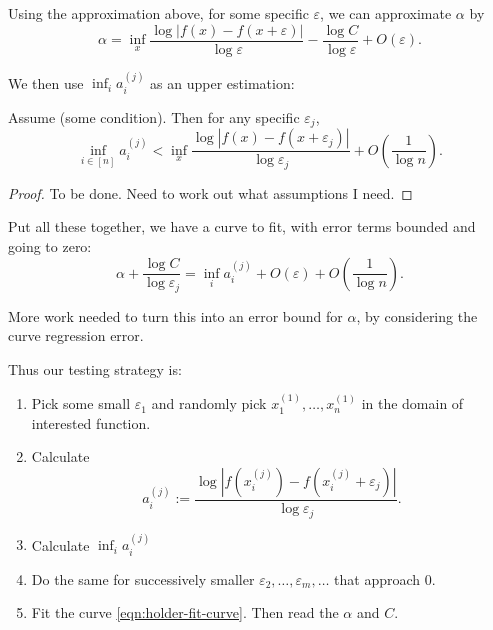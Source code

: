 Using the approximation above, for some specific $\varepsilon$, we can approximate $\alpha$ by
\[
	\alpha = \operatorname{inf}_x
		\frac{\log \left| f(x) - f(x+\varepsilon) \right|}{\log \varepsilon}
-\frac{\log C}{\log \varepsilon}  + O(\varepsilon)
.\] 

We then use $\operatorname{inf} _i a_i^{(j)}$ as an upper estimation:

\begin{theorem}
	Assume (some condition). Then for any specific $\varepsilon_j$,
\[
	\operatorname{inf} _{i \in [n]} a_i^{(j)} <
	 \operatorname{inf}_x
		\frac{\log \left| f(x) - f(x+\varepsilon_j) \right|}{\log \varepsilon_j} + O\left(\frac{1}{\log n}\right)
.\] 
\end{theorem}
\begin{proof}
	To be done. Need to work out what assumptions I need.
\end{proof}


Put all these together, we have a curve to fit, with error terms bounded and going to zero:
\begin{equation}
	\label{eqn:holder-fit-curve}
	\alpha + \frac{\log C}{\log \varepsilon_j} = \operatorname{inf} _i a_i^{(j)} + O\left(\varepsilon\right)+ O \left(\frac{1}{\log n}\right) 
.\end{equation} 

{\color{gray}More work needed to turn this into an error bound for $\alpha$, by considering the curve regression error.}

Thus our testing strategy is:
\begin{enumerate}
	\item Pick some small $\varepsilon_1$ and randomly pick $x_1^{(1)}, \ldots, x_n^{(1)}$ in the domain of interested function.
	\item Calculate
		\[
			a_i^{(j)} := \frac{\log \left| f(x_i^{(j)}) - f(x_i^{(j)} + \varepsilon_j) \right| }{\log \varepsilon_j}
		.\] 

	\item Calculate $\operatorname{inf} _i a_{i}^{(j)}$
	\item Do the same for successively smaller $\varepsilon_2, \ldots, \varepsilon_m, \ldots$ that approach $0$.
\item Fit the curve \eqref{eqn:holder-fit-curve}. Then read the $\alpha$ and $C$.
\end{enumerate}


